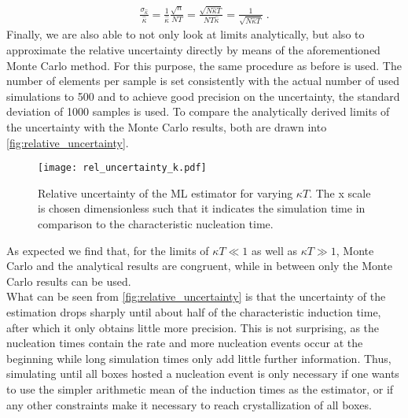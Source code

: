 \begin{align}
\label{eqn:uncertainty_k_ll}
\frac{\sigma_{\hat{\kappa}}}{\hat{\kappa}} = \frac{1}{\hat{\kappa}} \frac{\sqrt{n}}{NT} =\frac{\sqrt{N \hat{\kappa} T}}{N T \hat{\kappa}} =\frac{1}{\sqrt{N \hat{\kappa} T}} \; \text{.}
\end{align}
Finally, we are also able to not only look at limits analytically, but also to approximate the relative uncertainty directly by means of the aforementioned Monte Carlo method. For this purpose, the same procedure as before is used. The number of elements per sample is set consistently with the actual number of used simulations to 500 and to achieve good precision on the uncertainty, the standard deviation of 1000 samples is used. To compare the analytically derived limits of the uncertainty with the Monte Carlo results, both are drawn into \autoref{fig:relative_uncertainty}.

\begin{figure}[ht]
\begin{center}
\texttt{[image: rel\_uncertainty\_k.pdf]}
\caption[Nucleation rate uncertainty depending on measurement time]{Relative uncertainty of the ML estimator for varying $\kappa T$. The x scale is chosen dimensionless such that it indicates the simulation time in comparison to the characteristic nucleation time.}
\label{fig:relative_uncertainty}
\end{center}
\end{figure}

As expected we find that, for the limits of $\kappa T \ll 1$ as well as $\kappa T \gg 1$, Monte Carlo and the analytical results are congruent, while in between only the Monte Carlo results can be used.\\

What can be seen from \autoref{fig:relative_uncertainty} is that the uncertainty of the estimation drops sharply until about half of the characteristic induction time, after which it only obtains little more precision. This is not surprising, as the nucleation times contain the rate and more nucleation events occur at the beginning while long simulation times only add little further information. Thus, simulating until all boxes hosted a nucleation event is only necessary if one wants to use the simpler arithmetic mean of the induction times as the estimator, or if any other constraints make it necessary to reach crystallization of all boxes.

